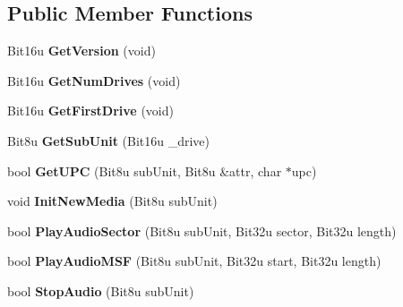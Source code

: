 \subsection*{Public Member Functions}
\begin{DoxyCompactItemize}
\item 
\hypertarget{classCMscdex_aa0171ef3598f6247cbab681650f27c1a}{Bit16u {\bfseries Get\-Version} (void)}\label{classCMscdex_aa0171ef3598f6247cbab681650f27c1a}

\item 
\hypertarget{classCMscdex_a5a5347a5f62cc476ce4660bffa9c59ed}{Bit16u {\bfseries Get\-Num\-Drives} (void)}\label{classCMscdex_a5a5347a5f62cc476ce4660bffa9c59ed}

\item 
\hypertarget{classCMscdex_a83c6d7ce25d9c4453c42af88cd090566}{Bit16u {\bfseries Get\-First\-Drive} (void)}\label{classCMscdex_a83c6d7ce25d9c4453c42af88cd090566}

\item 
\hypertarget{classCMscdex_af464d504ec1b87e3bebe1a5881288b03}{Bit8u {\bfseries Get\-Sub\-Unit} (Bit16u \-\_\-drive)}\label{classCMscdex_af464d504ec1b87e3bebe1a5881288b03}

\item 
\hypertarget{classCMscdex_a935f2827a5e6483af5cde6aed832fef2}{bool {\bfseries Get\-U\-P\-C} (Bit8u sub\-Unit, Bit8u \&attr, char $\ast$upc)}\label{classCMscdex_a935f2827a5e6483af5cde6aed832fef2}

\item 
\hypertarget{classCMscdex_a912da85172868635b5054b03504f24ce}{void {\bfseries Init\-New\-Media} (Bit8u sub\-Unit)}\label{classCMscdex_a912da85172868635b5054b03504f24ce}

\item 
\hypertarget{classCMscdex_afb1e3cef49876914963b669987415ded}{bool {\bfseries Play\-Audio\-Sector} (Bit8u sub\-Unit, Bit32u sector, Bit32u length)}\label{classCMscdex_afb1e3cef49876914963b669987415ded}

\item 
\hypertarget{classCMscdex_ac38f29f8c5bad65c549b6e61e40a0f61}{bool {\bfseries Play\-Audio\-M\-S\-F} (Bit8u sub\-Unit, Bit32u start, Bit32u length)}\label{classCMscdex_ac38f29f8c5bad65c549b6e61e40a0f61}

\item 
\hypertarget{classCMscdex_ad0afd07bd4b3f61fec5dd7ff51fb1b01}{bool {\bfseries Stop\-Audio} (Bit8u sub\-Unit)}\label{classCMscdex_ad0afd07bd4b3f61fec5dd7ff51fb1b01}


\end{DoxyCompactItemize}

